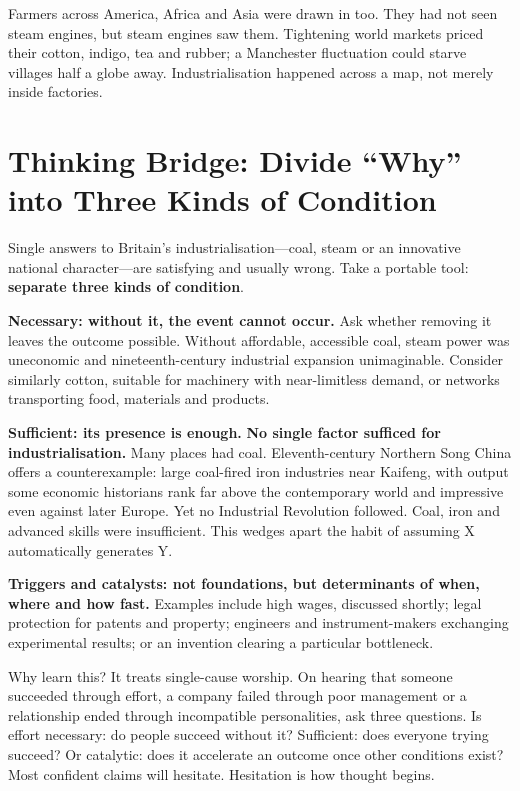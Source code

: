 Farmers across America, Africa and Asia were drawn in too. They had not seen steam engines, but steam engines saw them. Tightening world markets priced their cotton, indigo, tea and rubber; a Manchester fluctuation could starve villages half a globe away. Industrialisation happened across a map, not merely inside factories.

\section[Thinking Bridge: Three Conditions]{Thinking Bridge: Divide ``Why'' into Three Kinds of Condition}
Single answers to Britain's industrialisation---coal, steam or an innovative national character---are satisfying and usually wrong. Take a portable tool: \textbf{separate three kinds of condition}.

\textbf{Necessary: without it, the event cannot occur.} Ask whether removing it leaves the outcome possible. Without affordable, accessible coal, steam power was uneconomic and nineteenth-century industrial expansion unimaginable. Consider similarly cotton, suitable for machinery with near-limitless demand, or networks transporting food, materials and products.

\textbf{Sufficient: its presence is enough.} \textbf{No single factor sufficed for industrialisation.} Many places had coal. Eleventh-century Northern Song China offers a counterexample: large coal-fired iron industries near Kaifeng, with output some economic historians rank far above the contemporary world and impressive even against later Europe. Yet no Industrial Revolution followed. Coal, iron and advanced skills were insufficient. This wedges apart the habit of assuming X automatically generates Y.

\textbf{Triggers and catalysts: not foundations, but determinants of when, where and how fast.} Examples include high wages, discussed shortly; legal protection for patents and property; engineers and instrument-makers exchanging experimental results; or an invention clearing a particular bottleneck.

Why learn this? It treats single-cause worship. On hearing that someone succeeded through effort, a company failed through poor management or a relationship ended through incompatible personalities, ask three questions. Is effort necessary: do people succeed without it? Sufficient: does everyone trying succeed? Or catalytic: does it accelerate an outcome once other conditions exist? Most confident claims will hesitate. Hesitation is how thought begins.


